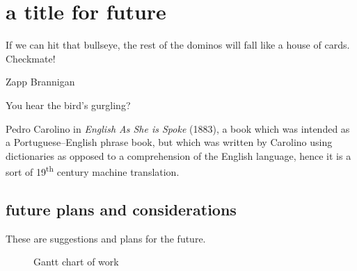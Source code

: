 \chapter{a title for future}
\label{chapter:future}

\epigraph{If we can hit that bullseye, the rest of the dominos will fall like a house of cards. Checkmate!}{Zapp Brannigan}

\epigraph{You hear the bird's gurgling?}{Pedro Carolino in \emph{English As She is Spoke} (1883), a book which was intended as a Portuguese--English phrase book, but which was written by Carolino using dictionaries as opposed to a comprehension of the English language, hence it is a sort of 19\textsuperscript{th} century machine translation.}

\section{future plans and considerations}

These are suggestions and plans for the future.

\begin{figure}
\label{Gantt_chart_1}
\begin{centering}
\caption{Gantt chart of work}
\end{centering}
\end{figure}
